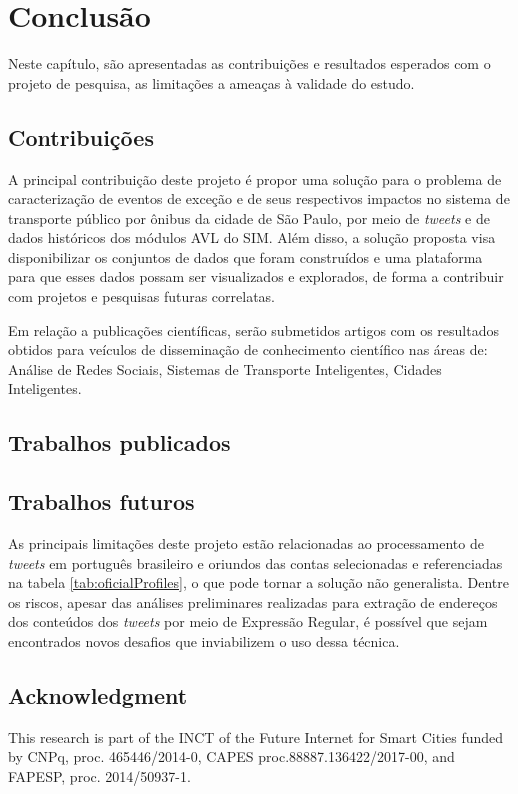 \documentclass[
	12pt,				%
	oneside,			%
	a4paper,			%
	english,			%
	brazil				%
	]{abntex2ppgsi}
\begin{document}
\chapter{Conclusão}
\label{conclusion}

Neste capítulo, são apresentadas as contribuições e resultados esperados com o projeto de pesquisa, as limitações a ameaças à validade do estudo. 

\section{Contribuições}

A principal contribuição deste projeto é propor uma solução para o problema de caracterização de eventos de exceção e de seus respectivos impactos no sistema de transporte público por ônibus da cidade de São Paulo, por meio de \textit{tweets} e de dados históricos dos módulos AVL do SIM. Além disso, a solução proposta visa disponibilizar os conjuntos de dados que foram construídos e uma plataforma para que esses dados possam ser visualizados e explorados, de forma a contribuir com projetos e pesquisas futuras correlatas.

Em relação a publicações científicas, serão submetidos artigos com os resultados obtidos para veículos de disseminação de conhecimento científico nas áreas de: Análise de Redes Sociais, Sistemas de Transporte Inteligentes, Cidades Inteligentes.

\section{Trabalhos publicados}

\section{Trabalhos futuros}
As principais limitações deste projeto estão relacionadas ao processamento de \textit{tweets} em português brasileiro e oriundos das contas selecionadas e referenciadas na tabela \ref{tab:oficialProfiles}, o que pode tornar a solução não generalista. Dentre os riscos, apesar das análises preliminares realizadas para extração de endereços dos conteúdos dos \textit{tweets} por meio de Expressão Regular, é possível que sejam encontrados novos desafios que inviabilizem o uso dessa técnica.

\section*{Acknowledgment}
This research is part of the INCT of the Future Internet for Smart Cities funded by CNPq, proc. 465446/2014-0, CAPES proc.88887.136422/2017-00, and FAPESP, proc. 2014/50937-1.
\end{document}
